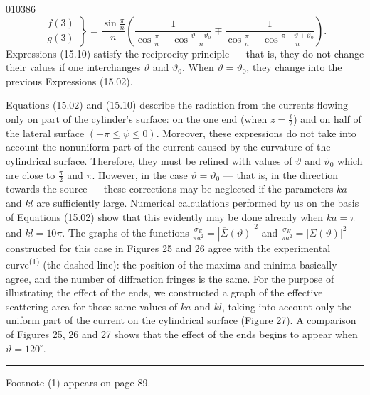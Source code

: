 \begin{scanpage}{0103}{86}
\[\left.\begin{matrix}f(3)\\g(3)\end{matrix}\right\}=\frac{\sin\frac\pi n}n\left(\frac1{\cos\frac\pi n-\cos\frac{\vartheta-\vartheta_0}n}\mp\frac1{\cos\frac\pi n-\cos\frac{\pi+\vartheta+\vartheta_0}n}\right).\tag{15.13}\]
Expressions (15.10) satisfy the reciprocity principle --- that is, they do not change their values if one interchanges $\vartheta$ and $\vartheta_0$. When $\vartheta=\vartheta_0$, they change into the previous Expressions (15.02).

Equations (15.02) and (15.10) describe the radiation from the currents flowing only on part of the cylinder's surface: on the one end (when $z=\frac l2$) and on half of the lateral surface $(-\pi\leq\psi\leq0)$. Moreover, these expressions do not take into account the nonuniform part of the current caused by the curvature of the cylindrical surface. Therefore, they must be refined with values of $\vartheta$ and $\vartheta_0$ which are close to $\frac\pi2$ and $\pi$. However, in the case $\vartheta=\vartheta_0$ --- that is, in the direction towards the source --- these corrections may be neglected if the parameters $ka$ and $kl$ are sufficiently large. Numerical calculations performed by us on the basis of Equations (15.02) show that this evidently may be done already when $ka=\pi$ and $kl=10\pi$. The graphs of the functions $\frac{\sigma_E}{\pi a^2}=|\overline\Sigma(\vartheta)|^2$ and $\frac{\sigma_H}{\pi a^2}=|\Sigma(\vartheta)|^2$ constructed for this case in Figures 25 and 26 agree with the experimental curve\textsuperscript{(1)} (the dashed line): the position of the maxima and minima basically agree, and the number of diffraction fringes is the same. For the purpose of illustrating the effect of the ends, we constructed a graph of the effective scattering area for those same values of $ka$ and $kl$, taking into account only the uniform part of the current on the cylindrical surface (Figure 27). A comparison of Figures 25, 26 and 27 shows that the effect of the ends begins to appear when $\vartheta=120^\circ$.

\vfill\noindent\rule{.5\linewidth}{.4pt}

Footnote (1) appears on page 89.
\end{scanpage}
